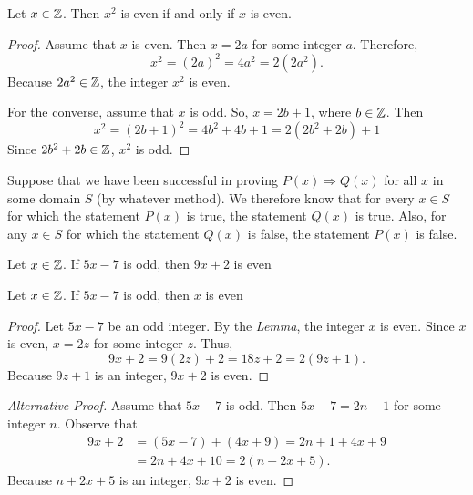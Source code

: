 \begin{thm}
     Let $x \in \mathbb{Z}$. Then $x^2$ is even if and only if $x$ is even.
\end{thm}
\begin{proof}
     Assume that $x$ is even. Then $x=2a$ for some integer $a$. Therefore,
     \begin{equation*}
         x^2 = (2a)^2 = 4a^2=2(2a^2).
     \end{equation*}
     Because $2a^2 \in \mathbb{Z}$, the integer $x^2$ is even.

     For the converse, assume that $x$ is odd. So, $x=2b+1$, where $b \in \mathbb{Z}$.
     Then
     \begin{equation*}
         x^2 = (2b+1)^2 = 4b^2+4b+1 = 2(2b^2+2b)+1
     \end{equation*} 
     Since $2b^2+2b \in \mathbb{Z}$, $x^2$ is odd.
\end{proof}
Suppose that we have been successful in proving $P(x) \Rightarrow Q(x)$ for all
$x$ in some domain $S$ (by whatever method). We therefore know that for every $x
\in S$ for which the statement $P(x)$ is true, the statement $Q(x)$ is true.
Also, for any $x \in S$ for which the statement $Q(x)$ is false, the statement
$P(x)$ is false.

\begin{problem}
    Let $x \in \mathbb{Z}$. If $5x-7$ is odd, then $9x+2$ is even   
    \begin{lemma}
        Let $x \in \mathbb{Z}$. If $5x-7$ is odd, then $x$ is even
    \end{lemma}
    \begin{proof}
        Let $5x-7$ be an odd integer. By the \emph{Lemma}, the integer $x$ is
        even. Since $x$ is even, $x=2z$ for some integer $z$. Thus,
        \begin{equation*}
            9x+2=9(2z)+2=18z+2=2(9z+1).
        \end{equation*}
        Because $9z+1$ is an integer, $9x+2$ is even.
    \end{proof}
    \begin{proof}[Alternative Proof]
        Assume that $5x-7$ is odd. Then $5x-7 = 2n+1$ for some integer $n$.
        Observe that
        \begin{align*}
            9x+2&=(5x-7)+(4x+9)=2n+1+4x+9 \\[1.25ex]
            &= 2n+4x+10=2(n+2x+5).
        \end{align*}
        Because $n + 2x + 5$ is an integer, $9x + 2$ is even.
    \end{proof}
\end{problem}

